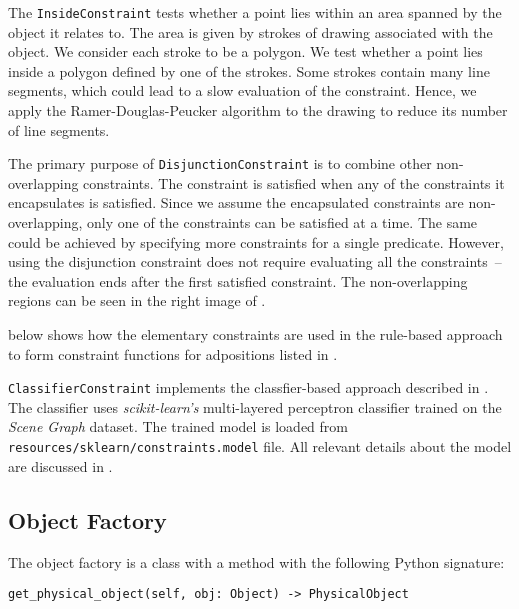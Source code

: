 \medskip

The \verb|InsideConstraint| tests whether a point lies within an area spanned by the object it relates to. The area is given by strokes of drawing associated with the object. We consider each stroke to be a polygon. We test whether a point lies inside a polygon defined by one of the strokes. Some strokes contain many line segments, which could lead to a slow evaluation of the constraint. Hence, we apply the Ramer-Douglas-Peucker \citep{douglas1973algorithms} algorithm to the drawing to reduce its number of line segments.

\medskip

The primary purpose of \verb|DisjunctionConstraint| is to combine other non-overlapping constraints. The constraint is satisfied when any of the constraints it encapsulates is satisfied. Since we assume the encapsulated constraints are non-overlapping, only one of the constraints can be satisfied at a time. The same could be achieved by specifying more constraints for a single predicate. However, using the disjunction constraint does not require evaluating all the constraints~-- the evaluation ends after the first satisfied constraint. The non-overlapping regions can be seen in the right image of . 

\medskip

 below shows how the elementary constraints are used in the rule-based approach to form constraint functions for adpositions listed in .



\verb|ClassifierConstraint| implements the classfier-based approach described in . The classifier uses \emph{scikit-learn's} \citep{scikit-learn} multi-layered perceptron classifier trained on the \emph{Scene Graph} dataset. The trained model is loaded from \verb|resources/sklearn/constraints.model| file. All relevant details about the model are discussed in .

\subsection{Object Factory}

The object factory is a class with a method with the following Python signature:
\begin{verbatim}
get_physical_object(self, obj: Object) -> PhysicalObject
\end{verbatim}

